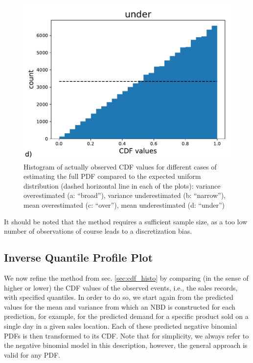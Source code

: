 \documentclass[BCOR=1mm, DIV=calc,10pt,
twoside=true,
twocolumn,
headings=normal]{scrartcl}
\begin{document}
\begin{figure}
\begin{center}
\includegraphics[scale=0.25]{figs/cdf_truth_under}
\caption{\label{fig:cdf_histos} Histogram of actually observed CDF values for different cases of estimating the full PDF compared to the expected uniform distribution (dashed horizontal line in each of the plots): variance overestimated (a: ``broad''), variance underestimated (b: ``narrow''), mean overestimated (c: ``over''), mean underestimated (d: ``under'')}
\end{center}
\end{figure}

It should be noted that the method requires a sufficient sample size, as a too low number of observations of course leads to a discretization bias.

\subsection{Inverse Quantile Profile Plot}
\label{sec:invquant_plot}

We now refine the method from sec. \ref{sec:cdf_histo} by comparing (in the sense of higher or lower) the CDF values of the observed events, i.e., the sales records, with specified quantiles. In order to do so, we start again from the predicted values for the mean and variance from which an NBD is constructed for each prediction, for example, for the predicted demand for a specific product sold on a single day in a given sales location. Each of these predicted negative binomial PDFs is then transformed to its CDF. Note that for simplicity, we always refer to the negative binomial model in this description, however, the general approach is valid for any PDF.
\end{document}
